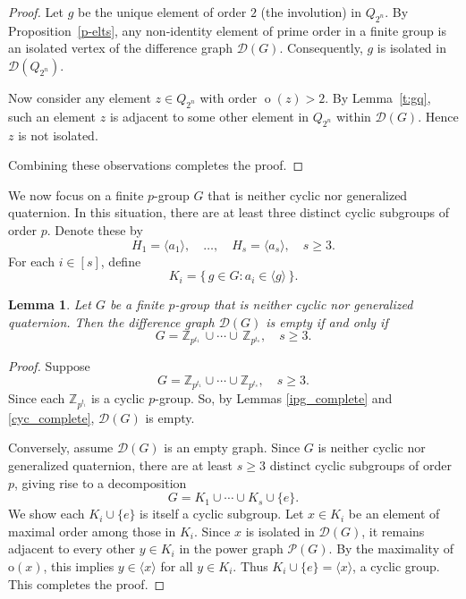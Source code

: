 \documentclass[12pt]{amsart}
\theoremstyle{plain}
\newtheorem{lemma}[theorem]{Lemma}
\theoremstyle{remark}
\theoremstyle{definition}
\begin{document}
\begin{proof}
Let \( g \) be the unique element of order \(2\) (the involution) in \(Q_{2^n}\). By Proposition~\ref{p-elts}, any non‑identity element of prime order in a finite group is an isolated vertex of the difference graph \(\mathcal{D}(G)\). Consequently, \(g\) is isolated in \(\mathcal{D}(Q_{2^n})\).

Now consider any element \( z \in Q_{2^n} \) with order \( \operatorname{o}(z) > 2 \). By Lemma~\ref{t:gq}, such an element \(z\) is adjacent to some other element in \(Q_{2^n}\) within \(\mathcal{D}(G)\). Hence \(z\) is not isolated.

Combining these observations completes the proof.
\end{proof}


\noindent
We now focus on a finite \(p\)-group \(G\) that is neither cyclic nor generalized quaternion. In this situation, there are at least three distinct cyclic subgroups of order \(p\). Denote these by
\[
H_1 = \langle a_1 \rangle, \quad \ldots, \quad H_s = \langle a_s \rangle, 
\quad s \ge 3.
\]
For each \(i \in [s]\), define
\[
K_i = \{\,g \in G : a_i \in \langle g \rangle\,\}.
\]

\begin{lemma}\label{t:totdisc}
Let \(G\) be a finite \(p\)-group that is neither cyclic nor generalized quaternion. Then the difference graph \(\mathcal{D}(G)\) is empty if and only if
\[
G = \mathbb{Z}_{p^{t_1}} \,\cup\cdots\cup\,\mathbb{Z}_{p^{t_s}},
\quad s \ge 3.
\]
\end{lemma}

\begin{proof}
Suppose 
\[
G = \mathbb{Z}_{p^{t_1}} \cup \cdots \cup \mathbb{Z}_{p^{t_s}},
\quad s \ge 3.
\]
Since each \(\mathbb{Z}_{p^{t_i}}\) is a cyclic $p$-group. So, by Lemmas \ref{ipg_complete} and \ref{cyc_complete}, $\mathcal{D}(G)$ is empty. 

Conversely, assume \(\mathcal{D}(G)\) is an empty graph. Since \(G\) is neither cyclic nor generalized quaternion, there are at least \(s \ge 3\) distinct cyclic subgroups of order \(p\), giving rise to a decomposition
\[
G = K_1 \cup \cdots \cup K_s\cup \{e\}.
\]
We show each \(K_i\cup \{e\}\) is itself a cyclic subgroup.
Let \(x \in K_i\) be an element of maximal order among those in \(K_i\). Since \(x\) is isolated in \(\mathcal{D}(G)\), it remains adjacent to every other \(y \in K_i\) in the power graph \(\mathcal{P}(G)\). By the maximality of \(\mathrm{o}(x)\), this implies \(y \in \langle x \rangle\) for all \(y \in K_i\). Thus \(K_i\cup \{e\} = \langle x \rangle\), a cyclic group.
This completes the proof.
\end{proof}
\end{document}
